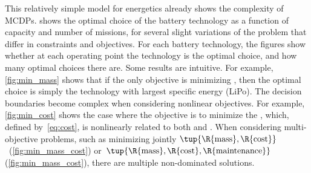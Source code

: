 This relatively simple model for energetics already shows the complexity of MCDPs.
 shows the optimal choice of the battery technology as a function of capacity and number of missions, for several slight variations of the problem that differ in constraints and objectives.
For each battery technology, the figures show whether at each operating point the technology is the optimal choice, and how many optimal choices there are.
Some  results are intuitive.
For example, \cref{fig:min_mass} shows that if the only objective is minimizing , then the optimal choice is simply the technology with largest specific energy (LiPo).
The decision boundaries become complex when considering nonlinear objectives.
For example, \cref{fig:min_cost} shows the case where the objective is to minimize the , which, defined by~\cref{eq:cost}, is nonlinearly related to both  and .
When considering multi-objective problems, such as minimizing jointly $\tup{ \R{\text{mass}},\R{\text{cost}}} $~(\cref{fig:min_mass_cost}) or~$\tup{ \R{\text{mass}},\R{\text{cost}},\R{\text{maintenance}}} $ (\cref{fig:min_mass_cost}), there are multiple non-dominated solutions.

